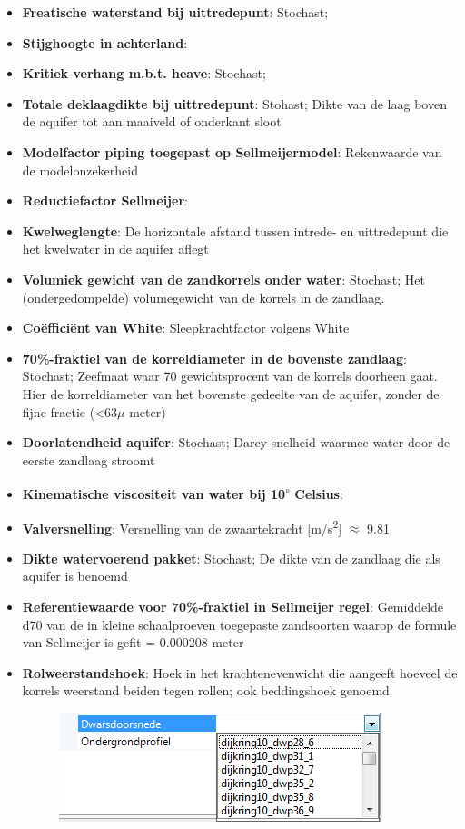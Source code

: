 \begin{enumerate}
\begin{itemize}
	\item \textbf{Freatische waterstand bij uittredepunt}: Stochast; 
	\item \textbf{Stijghoogte in achterland}: 
	\item \textbf{Kritiek verhang m.b.t. heave}: Stochast; 
	\item \textbf{Totale deklaagdikte bij uittredepunt}: Stohast; Dikte van de laag boven de aquifer tot aan maaiveld of onderkant sloot
	\item \textbf{Modelfactor piping toegepast op Sellmeijermodel}: Rekenwaarde van de modelonzekerheid
	\item \textbf{Reductiefactor Sellmeijer}: 
	\item \textbf{Kwelweglengte}: De horizontale afstand tussen intrede- en uittredepunt die het kwelwater in de aquifer aflegt
	\item \textbf{Volumiek gewicht van de zandkorrels onder water}: Stochast; Het (ondergedompelde) volumegewicht van de korrels in de zandlaag.
	\item \textbf{Co\"{e}ffici\"{e}nt van White}: Sleepkrachtfactor volgens White
	\item \textbf{70\%-fraktiel van de korreldiameter in de bovenste zandlaag}: Stochast; Zeefmaat waar 70 gewichtsprocent van de korrels doorheen gaat. Hier de korreldiameter van het bovenste gedeelte van de aquifer, zonder de fijne fractie (<63$\mu$ meter)
	\item \textbf{Doorlatendheid aquifer}: Stochast; Darcy-snelheid waarmee water door de eerste zandlaag stroomt
	\item \textbf{Kinematische viscositeit van water bij 10\textsuperscript{$\circ$} Celsius}: 
	\item \textbf{Valversnelling}: Versnelling van de zwaartekracht [m/s\textsuperscript{2}] $\approx$ 9.81
	\item \textbf{Dikte watervoerend pakket}: Stochast; De dikte van de zandlaag die als aquifer is benoemd
	\item \textbf{Referentiewaarde voor 70\%-fraktiel in Sellmeijer regel}: Gemiddelde d70 van de in kleine schaalproeven toegepaste zandsoorten waarop de formule van Sellmeijer is gefit = 0.000208 meter
	\item \textbf{Rolweerstandshoek}: Hoek in het krachtenevenwicht die aangeeft hoeveel de korrels weerstand beiden tegen rollen; ook beddingshoek genoemd
	\begin{figure} [H]
	\centering
		\includegraphics{figures/chapter_piping/PipingSurfacelines}

\end{figure}
\end{itemize}
\end{enumerate}
